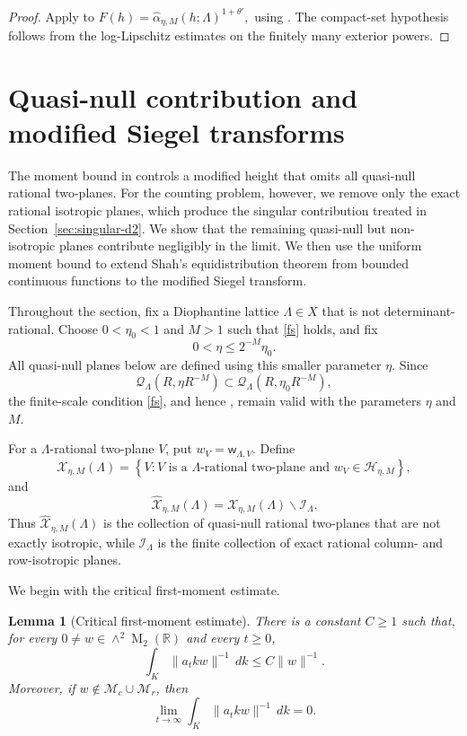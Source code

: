 \documentclass[reqno,11pt]{amsart}
\newtheorem{lem}[lem]{Lemma}
\theoremstyle{definition}
\theoremstyle{remark}
\numberwithin{equation}{section}
\newcommand{\M}{\operatorname{M}}
\begin{document}
\begin{proof}
Apply  to
$
F(h)
=
\widehat\alpha_{\eta,M}(h;\Lambda)^{1+\theta'},
$
using . The compact-set hypothesis follows from
the log-Lipschitz estimates on the finitely many exterior powers.
\end{proof}

\section{Quasi-null contribution and modified Siegel transforms}
\label{sec:modified-siegel-d2}

The moment bound in  controls a modified height that
omits all quasi-null rational two-planes. For the counting problem,
however, we remove only the exact rational isotropic planes, which produce
the singular contribution treated in
Section~\ref{sec:singular-d2}. We show that the remaining quasi-null but
non-isotropic planes contribute negligibly in the limit. We then use the
uniform moment bound to extend Shah's equidistribution theorem
 from bounded continuous functions to the modified Siegel
transform.

Throughout the section, fix a Diophantine lattice
$\Lambda\in X$ that is not determinant-rational. Choose
$0<\eta_0<1$ and $M>1$ such that \eqref{fs} holds, and fix
$$
0<\eta\le2^{-M}\eta_0.
$$
All quasi-null planes below are defined using this smaller parameter
$\eta$. Since
$$
\mathcal Q_\Lambda(R,\eta R^{-M})
\subset
\mathcal Q_\Lambda(R,\eta_0R^{-M}),
$$
the finite-scale condition \eqref{fs}, and hence
, remain valid with the parameters $\eta$ and $M$.

For a $\Lambda$-rational two-plane $V$, put
$w_V=\mathsf w_{\Lambda,V}$. Define
$$
\mathcal X_{\eta,M}(\Lambda)
=
\left\{
V:
V\text{ is a $\Lambda$-rational two-plane and }
w_V\in\mathcal H_{\eta,M}
\right\},
$$
and
$$
\widehat{\mathcal X}_{\eta,M}(\Lambda)
=
\mathcal X_{\eta,M}(\Lambda)\smallsetminus\mathcal I_\Lambda.
$$
Thus $\widehat{\mathcal X}_{\eta,M}(\Lambda)$ is the collection of
quasi-null rational two-planes that are not exactly isotropic, while
$\mathcal I_\Lambda$ is the finite collection of exact rational
column- and row-isotropic planes.

We begin with the critical first-moment estimate.

\begin{lem}[Critical first-moment estimate]
\label{lem:critical-K-average-d2}
There is a constant $C\ge1$ such that, for every
$0\ne w\in\wedge^2\M_2(\mathbb R)$ and every $t\ge0$,
\begin{equation}\label{eq:critical-K-average-d2}
\int_K\|a_tkw\|^{-1}\,dk
\le
C\|w\|^{-1}.
\end{equation}
Moreover, if $w\notin\mathcal M_c\cup\mathcal M_r$, then
\begin{equation}\label{eq:critical-K-average-decay-d2}
\lim_{t\to\infty}
\int_K\|a_tkw\|^{-1}\,dk
=
0.
\end{equation}
\end{lem}
\end{document}
